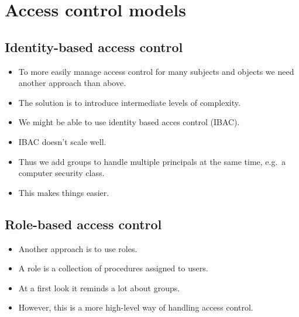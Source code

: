 \documentclass{beamer}
\begin{document}
\section{Access control models}

\subsection{Identity-based access control}

\begin{frame}
  \begin{itemize}
    \item To more easily manage access control for many subjects and objects we 
      need another approach than above.

    \item The solution is to introduce intermediate levels of complexity.

  \end{itemize}
\end{frame}

\begin{frame}
  \begin{itemize}
    \item We might be able to use identity based acces control (IBAC).
    \item IBAC doesn't scale well.

    \item Thus we add groups to handle multiple principals at the same time, 
      e.g.\ a computer security class.

    \item This makes things easier.

  \end{itemize}
\end{frame}

\subsection{Role-based access control}

\begin{frame}
  \begin{itemize}
    \item Another approach is to use roles.

    \item A role is a collection of procedures assigned to users.

    \item At a first look it reminds a lot about groups.

    \item However, this is a more high-level way of handling access control.

  \end{itemize}
\end{frame}
\end{document}

